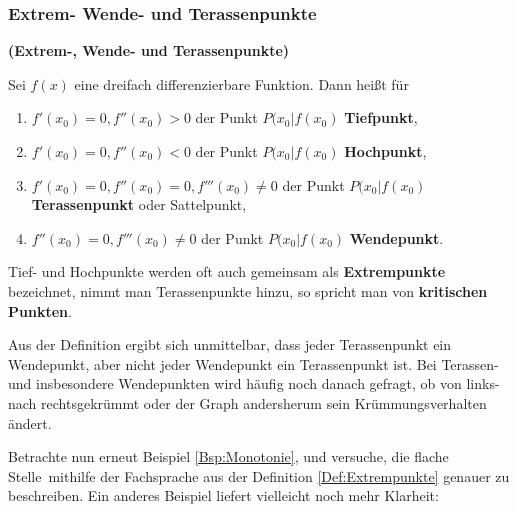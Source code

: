 \documentclass[ngerman, 12pt]{nssheetxea}
\begin{document}
\subsubsection{Extrem- Wende- und Terassenpunkte}

\begin{definition} \textbf{(Extrem-, Wende- und Terassenpunkte)} \par
Sei $f(x)$ eine dreifach differenzierbare Funktion. Dann heißt für
\begin{enumerate}
\item $f'(x_0)=0, f''(x_0)> 0$ der Punkt $P(x_0|f(x_0)$ \textbf{Tiefpunkt}, 
\item $f'(x_0)=0, f''(x_0)< 0$ der Punkt $P(x_0|f(x_0)$ \textbf{Hochpunkt}, 
\item $f'(x_0)=0, f''(x_0)= 0, f'''(x_0)\neq 0$ der Punkt $P(x_0|f(x_0)$ \textbf{Terassenpunkt} oder Sattelpunkt,  
\item $f''(x_0)= 0, f'''(x_0)\neq 0$ der Punkt $P(x_0|f(x_0)$ \textbf{Wendepunkt}. 
\end{enumerate}
Tief- und Hochpunkte werden oft auch gemeinsam als \textbf{Extrempunkte} bezeichnet, nimmt man Terassenpunkte hinzu, so spricht man von \textbf{kritischen Punkten}.
\label{Def:Extrempunkte}
\end{definition}
Aus der Definition ergibt sich unmittelbar, dass jeder Terassenpunkt ein Wendepunkt, aber nicht jeder Wendepunkt ein Terassenpunkt ist. Bei Terassen- und insbesondere Wendepunkten wird häufig noch danach gefragt, ob von links- nach rechtsgekrümmt oder der Graph andersherum sein Krümmungsverhalten ändert. \par
Betrachte nun erneut Beispiel \ref{Bsp:Monotonie}, und versuche, die \glqq flache Stelle\grqq \ mithilfe der Fachsprache aus der Definition \ref{Def:Extrempunkte} genauer zu beschreiben. Ein anderes Beispiel liefert vielleicht noch mehr Klarheit:
\end{document}
